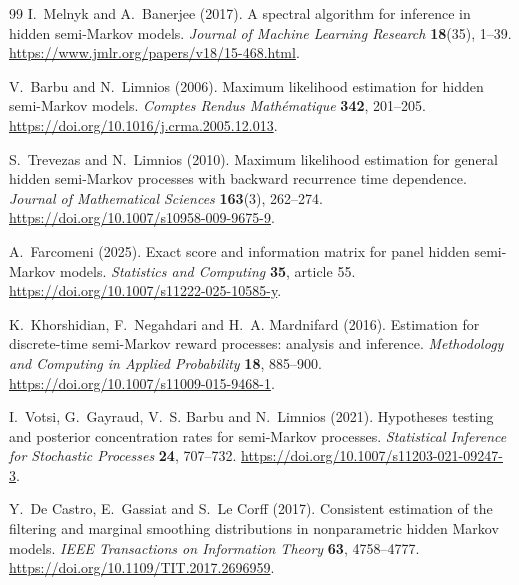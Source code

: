\documentclass[11pt]{article}
\theoremstyle{definition}
\theoremstyle{remark}
\begin{document}
\begin{thebibliography}{99}
I.~Melnyk and A.~Banerjee (2017).
A spectral algorithm for inference in hidden semi-Markov models.
\emph{Journal of Machine Learning Research} \textbf{18}(35), 1--39.
\url{https://www.jmlr.org/papers/v18/15-468.html}.

V.~Barbu and N.~Limnios (2006).
Maximum likelihood estimation for hidden semi-Markov models.
\emph{Comptes Rendus Math\'ematique} \textbf{342}, 201--205.
\url{https://doi.org/10.1016/j.crma.2005.12.013}.

S.~Trevezas and N.~Limnios (2010).
Maximum likelihood estimation for general hidden semi-Markov processes with
backward recurrence time dependence.
\emph{Journal of Mathematical Sciences} \textbf{163}(3), 262--274.
\url{https://doi.org/10.1007/s10958-009-9675-9}.

A.~Farcomeni (2025).
Exact score and information matrix for panel hidden semi-Markov models.
\emph{Statistics and Computing} \textbf{35}, article 55.
\url{https://doi.org/10.1007/s11222-025-10585-y}.

K.~Khorshidian, F.~Negahdari and H.~A. Mardnifard (2016).
Estimation for discrete-time semi-Markov reward processes: analysis and
inference.
\emph{Methodology and Computing in Applied Probability} \textbf{18},
885--900.
\url{https://doi.org/10.1007/s11009-015-9468-1}.

I.~Votsi, G.~Gayraud, V.~S. Barbu and N.~Limnios (2021).
Hypotheses testing and posterior concentration rates for semi-Markov
processes.
\emph{Statistical Inference for Stochastic Processes} \textbf{24}, 707--732.
\url{https://doi.org/10.1007/s11203-021-09247-3}.

Y.~De Castro, E.~Gassiat and S.~Le Corff (2017).
Consistent estimation of the filtering and marginal smoothing distributions
in nonparametric hidden Markov models.
\emph{IEEE Transactions on Information Theory} \textbf{63}, 4758--4777.
\url{https://doi.org/10.1109/TIT.2017.2696959}.

\end{thebibliography}
\end{document}
